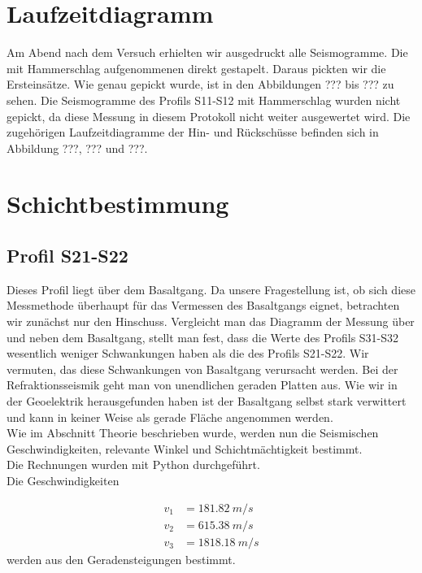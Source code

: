 \section{Laufzeitdiagramm}

Am Abend nach dem Versuch erhielten wir ausgedruckt alle Seismogramme. Die mit Hammerschlag aufgenommenen direkt gestapelt. Daraus pickten wir die Ersteinsätze. Wie genau gepickt wurde, ist in den Abbildungen ??? bis ??? zu sehen. Die Seismogramme des Profils S11-S12 mit Hammerschlag wurden nicht gepickt, da diese Messung in diesem Protokoll nicht weiter ausgewertet wird. Die zugehörigen Laufzeitdiagramme der Hin- und Rückschüsse befinden sich in Abbildung ???, ??? und ???.

\section{Schichtbestimmung}



\subsection{Profil S21-S22 }

Dieses Profil liegt über dem Basaltgang. Da unsere Fragestellung ist, ob sich diese Messmethode überhaupt für das Vermessen des Basaltgangs eignet, betrachten wir zunächst nur den Hinschuss. Vergleicht man das Diagramm der Messung über und neben dem Basaltgang, stellt man fest, dass die Werte des Profils S31-S32 wesentlich weniger Schwankungen haben als die des Profils S21-S22.
Wir vermuten, das diese Schwankungen von Basaltgang verursacht werden. Bei der Refraktionsseismik geht man von unendlichen geraden Platten aus. Wie wir in der Geoelektrik herausgefunden haben ist der Basaltgang selbst stark verwittert und kann in keiner Weise als gerade Fläche angenommen werden.\\


Wie im Abschnitt Theorie beschrieben wurde, werden nun die Seismischen Geschwindigkeiten, relevante Winkel und Schichtmächtigkeit bestimmt.\\
Die Rechnungen wurden mit Python durchgeführt.\\

Die Geschwindigkeiten 

\begin{align}
 v_1 &= \SI{181.82}{m/s} \\
 v_2 &= \SI{615.38}{m/s} \\
 v_3 &= \SI{1818.18}{m/s}
\end{align}
werden aus den Geradensteigungen bestimmt.

